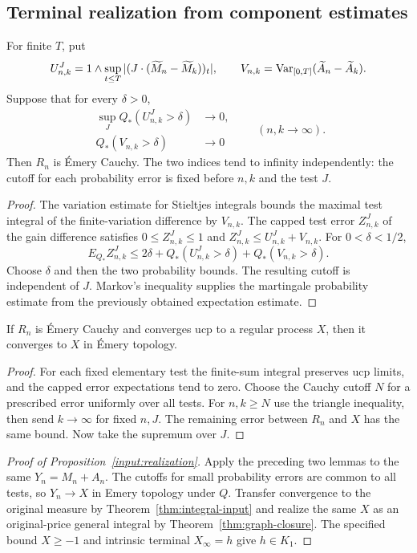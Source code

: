 \subsection{Terminal realization from component estimates}
\label{sec:component-realization}
\begin{lemma}
For finite $T$, put
\[
 U^J_{n,k}=1\wedge\sup_{t\leq T}|(J\cdot(\widetilde M_n-\widetilde M_k))_t|,
 \qquad V_{n,k}=\operatorname{Var}_{[0,T]}(\widetilde A_n-\widetilde A_k).
\]
Suppose that for every $\delta>0$,
\[
 \begin{aligned}
 \sup_J Q_*(U^J_{n,k}>\delta)&\longrightarrow0,\\
 Q_*(V_{n,k}>\delta)&\longrightarrow0
 \end{aligned}
 \qquad(n,k\longrightarrow\infty).
\]
Then $R_n$ is Émery Cauchy. The two indices tend to infinity independently:
the cutoff for each probability error is fixed before $n,k$ and the test $J$.
\end{lemma}
\begin{proof}
The variation estimate for Stieltjes integrals bounds the maximal test integral
of the finite-variation difference by $V_{n,k}$. The capped test error
$Z^J_{n,k}$ of the gain difference satisfies $0\leq Z^J_{n,k}\leq1$ and
$Z^J_{n,k}\leq U^J_{n,k}+V_{n,k}$. For $0<\delta<1/2$,
\[
 E_{Q_*}Z^J_{n,k}\leq2\delta+Q_*(U^J_{n,k}>\delta)+Q_*(V_{n,k}>\delta).
\]
Choose $\delta$ and then the two probability bounds. The resulting cutoff is
independent of $J$. Markov's inequality supplies the martingale probability
estimate from the previously obtained expectation estimate.
\end{proof}
\begin{lemma}
If $R_n$ is Émery Cauchy and converges ucp to a regular process $X$, then it
converges to $X$ in Émery topology.
\end{lemma}
\begin{proof}
For each fixed elementary test the finite-sum integral preserves ucp limits,
and the capped error expectations tend to zero. Choose the Cauchy cutoff $N$
for a prescribed error uniformly over all tests. For $n,k\geq N$ use the
triangle inequality, then send $k\to\infty$ for fixed $n,J$. The remaining
error between $R_n$ and $X$ has the same bound. Now take the supremum over $J$.
\end{proof}

\begin{proof}[Proof of Proposition~\ref{input:realization}]
Apply the preceding two lemmas to the same $Y_n=M_n+A_n$.
The cutoffs for small probability errors are common to all tests, so $Y_n\to X$ in Emery topology under $Q$.
Transfer convergence to the original measure by Theorem~\ref{thm:integral-input} and realize the same $X$
as an original-price general integral by Theorem~\ref{thm:graph-closure}.
The specified bound $X\geq-1$ and intrinsic terminal $X_\infty=h$ give $h\in K_1$.
\end{proof}
